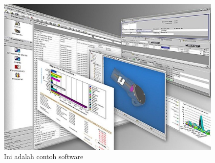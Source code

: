 \begin{figure}[!htbp]
  \centering
  \includegraphics[width=.75\textwidth]{figures/software/software.jpg}
  \caption{Ini adalah contoh software}\label{fig:software}
\end{figure}